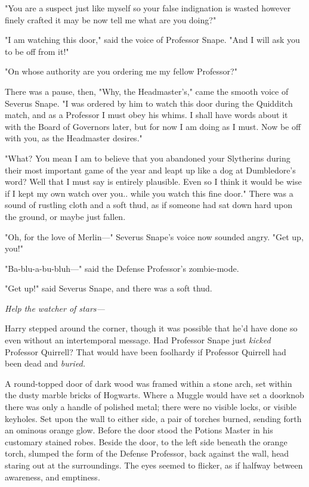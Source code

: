 "You are a suspect{\el} just like myself{\el} so your false indignation
is wasted{\el} however finely crafted it may be{\el} now tell me{\el}
what are you doing?"

"I am watching this door," said the voice of Professor Snape. "And I will ask
you to be off from it!"

"On whose authority{\el} are you ordering me{\el} my fellow Professor?"

There was a pause, then, "Why, the Headmaster's," came the smooth voice of
Severus Snape. "I was ordered by him to watch this door during the Quidditch
match, and as a Professor I must obey his whims. I shall have words about it
with the Board of Governors later, but for now I am doing as I must. Now be off
with you, as the Headmaster desires."

"What? You mean I am to believe{\el} that you abandoned your
Slytherins{\el} during their most important{\el} game of the year{\el}
and leapt up like a dog{\el} at Dumbledore's word? Well that{\el} I must
say{\el} is entirely plausible. Even so{\el} I think it would be
wise{\el} if I kept my own watch over you.. while you watch this fine door."
There was a sound of rustling cloth and a soft thud, as if someone had sat down
hard upon the ground, or maybe just fallen.

"Oh, for the love of Merlin—" Severus Snape's voice now sounded angry. "Get
up, you!"

"Ba-blu-a-bu-bluh—" said the Defense Professor's zombie-mode.

"Get up!" said Severus Snape, and there was a soft thud.

\emph{Help the watcher of stars—}

Harry stepped around the corner, though it was possible that he'd have done so
even without an intertemporal message. Had Professor Snape just \emph{kicked}
Professor Quirrell? That would have been foolhardy if Professor Quirrell had
been dead and \emph{buried.}

A round-topped door of dark wood was framed within a stone arch, set within the
dusty marble bricks of Hogwarts. Where a Muggle would have set a doorknob there
was only a handle of polished metal; there were no visible locks, or visible
keyholes. Set upon the wall to either side, a pair of torches burned, sending
forth an ominous orange glow. Before the door stood the Potions Master in his
customary stained robes. Beside the door, to the left side beneath the orange
torch, slumped the form of the Defense Professor, back against the wall, head
staring out at the surroundings. The eyes seemed to flicker, as if halfway
between awareness, and emptiness.

